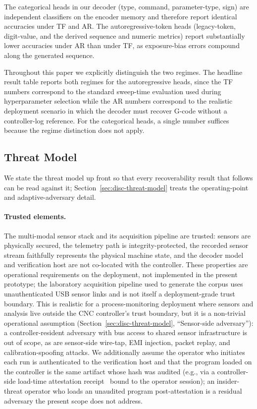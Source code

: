 \documentclass[sensors,article,submit,moreauthors,pdftex]{Definitions/mdpi}
\begin{document}
The categorical heads in our decoder (type, command, parameter-type, sign) are independent classifiers on the encoder memory and therefore report identical accuracies under TF and AR. The autoregressive-token heads (legacy-token, digit-value, and the derived sequence and numeric metrics) report substantially lower accuracies under AR than under TF, as exposure-bias errors compound along the generated sequence.

Throughout this paper we explicitly distinguish the two regimes. The headline result table reports both regimes for the autoregressive heads, since the TF numbers correspond to the standard sweep-time evaluation used during hyperparameter selection while the AR numbers correspond to the realistic deployment scenario in which the decoder must recover G-code without a controller-log reference. For the categorical heads, a single number suffices because the regime distinction does not apply.

\subsection{Threat Model}
\label{sec:problem-threat-model}

We state the threat model up front so that every recoverability result that follows can be read against it; Section~\ref{sec:disc-threat-model} treats the operating-point and adaptive-adversary detail.

\paragraph{Trusted elements.} The multi-modal sensor stack and its acquisition pipeline are trusted: sensors are physically secured, the telemetry path is integrity-protected, the recorded sensor stream faithfully represents the physical machine state, and the decoder model and verification host are not co-located with the controller. These properties are operational requirements on the deployment, not implemented in the present prototype; the laboratory acquisition pipeline used to generate the corpus uses unauthenticated USB sensor links and is not itself a deployment-grade trust boundary. This is realistic for a process-monitoring deployment where sensors and analysis live outside the CNC controller's trust boundary, but it is a non-trivial operational assumption (Section~\ref{sec:disc-threat-model}, ``Sensor-side adversary''): a controller-resident adversary with bus access to shared sensor infrastructure is out of scope, as are sensor-side wire-tap, EMI injection, packet replay, and calibration-spoofing attacks. We additionally assume the operator who initiates each run is authenticated to the verification host and that the program loaded on the controller is the same artifact whose hash was audited (e.g., via a controller-side load-time attestation receipt~\cite{zonouz2014plc} bound to the operator session); an insider-threat operator who loads an unaudited program post-attestation is a residual adversary the present scope does not address.
\end{document}
